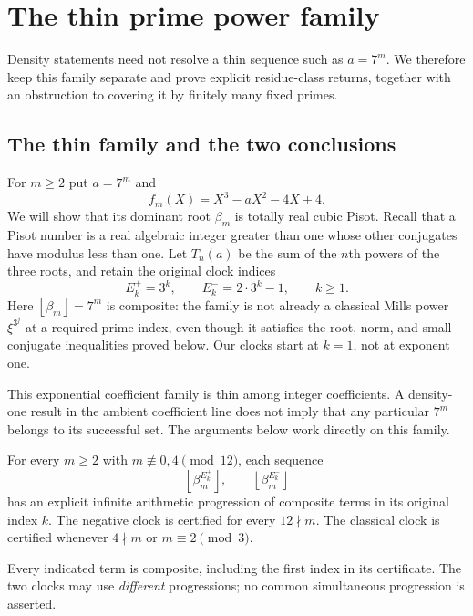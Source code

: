 \documentclass[11pt,a4paper]{article}
\theoremstyle{definition}\newtheorem{definition}[theorem]{Definition}
\theoremstyle{remark}\newtheorem{remark}[theorem]{Remark}
\newcommand{\floor}[1]{\left\lfloor#1\right\rfloor}
\begin{document}
\section{The thin prime power family}\label{src:R12}
Density statements need not resolve a thin sequence such as $a=7^m$. We therefore keep this family separate and prove explicit residue-class returns, together with an obstruction to covering it by finitely many fixed primes.
\medskip
\begingroup



\subsection{The thin family and the two conclusions}

For $m\ge2$ put $a=7^m$ and
\begin{equation}\label{R12:eq:family}
 f_m(X)=X^3-aX^2-4X+4.
\end{equation}
We will show that its dominant root $\beta_m$ is totally real cubic
Pisot. Recall that a Pisot number is a real algebraic integer greater
than one whose other conjugates have modulus less than one. Let
$T_n(a)$ be the sum of the $n$th powers of the three roots, and retain
the original clock indices
\begin{equation}\label{R12:eq:clocks}
 E_k^+=3^k,\qquad E_k^-=2\cdot3^k-1,\qquad k\ge1.
\end{equation}
Here $\floor{\beta_m}=7^m$ is composite: the family is not already a
classical Mills power $\xi^{3^j}$ at a required prime index, even though
it satisfies the root, norm, and small-conjugate inequalities proved below.
Our clocks start at $k=1$, not at exponent one.

This exponential coefficient family is thin among integer coefficients.
A density-one result in the ambient coefficient line does not imply
that any particular $7^m$ belongs to its successful set. The arguments
below work directly on this family.

\begin{mainthm}\label{R12:thm:A}
For every $m\ge2$ with $m\not\equiv0,4\pmod{12}$, each sequence
\[
 \floor{\beta_m^{E_k^+}},\qquad \floor{\beta_m^{E_k^-}}
\]
has an explicit infinite arithmetic progression of composite terms
in its original index $k$. The negative clock is certified for every
$12\nmid m$. The classical clock is certified whenever $4\nmid m$ or
$m\equiv2\pmod3$.

Every indicated term is composite, including the first index in its
certificate. The two clocks may use \emph{different} progressions;
no common simultaneous progression is asserted.
\end{mainthm}
\end{document}

